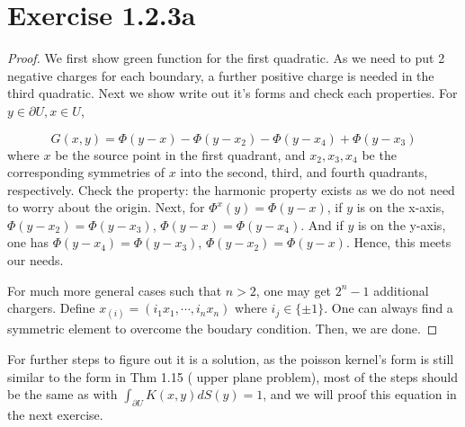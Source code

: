 \section*{Exercise 1.2.3a}
\begin{proof}
    We first show green function for the first quadratic. As we need to put 2 negative charges for each boundary, a further positive charge is needed in the third quadratic. Next we show write out it's forms and check each properties. For $y \in \partial U, x\in U$,

\begin{equation}
    G(x,y) = \Phi(y-x) -  \Phi(y-x_2) - \Phi(y-x_4) + \Phi(y-x_3)
\end{equation}
where $x$ be the source point in the first quadrant, and $x_2, x_3, x_4$ be the corresponding symmetries of $x$ into the second, third, and fourth quadrants, respectively. Check the property: the harmonic property exists as we do not need to worry about the origin. Next, for $\Phi^{x}(y) = \Phi(y-x)$, if $y$ is on the x-axis, $\Phi(y-x_2) = \Phi(y-x_3)$, $\Phi(y-x) = \Phi(y-x_4)$. And if $y$ is on the y-axis, one has $\Phi(y-x_4) = \Phi(y-x_3)$, $\Phi(y-x_2) = \Phi(y-x)$. Hence, this meets our needs.

For much more general cases such that $n>2$, one may get $2^n-1$ additional chargers. Define $x_{(i)} = (i_1 x_1,\cdots, i_nx_n)$ where $i_j \in \{\pm 1\}$. One can always find a symmetric element to overcome the boudary condition. Then, we are done.
\end{proof}

For further steps to figure out it is a solution, as the poisson kernel's form is still similar to the form in Thm 1.15 ( upper plane problem), most of the steps should be the same as with $\int_{\partial U} K(x,y) dS(y) = 1$, and we will proof this equation in the next exercise.

